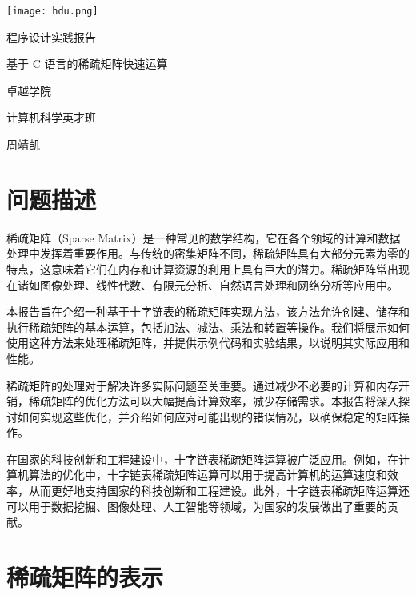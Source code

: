 \documentclass[12pt]{article}
\begin{document}
\begin{titlepage}


\parbox[c]{0pt}{
    \texttt{[image: hdu.png]}
}

\setlength{\parindent}{0pt}
\centering
\vfill
{ \heiti \textcolor{xblue}{程序设计实践报告}\par}
\vspace{10pt}
{ \heiti 基于 C 语言的稀疏矩阵快速运算\par}
\vfill
{\large \heiti 卓越学院\par
计算机科学英才班\par
周靖凯\par
}
\vfill
\restoregeometry

\end{titlepage}

\renewcommand\contentsname{\textcolor{xblue}{目录}}
    \tableofcontents
\clearpage

\setcounter{page}{1}

\section{问题描述}

稀疏矩阵（Sparse Matrix）是一种常见的数学结构，它在各个领域的计算和数据处理中发挥着重要作用。与传统的密集矩阵不同，稀疏矩阵具有大部分元素为零的特点，这意味着它们在内存和计算资源的利用上具有巨大的潜力。稀疏矩阵常出现在诸如图像处理、线性代数、有限元分析、自然语言处理和网络分析等应用中。

本报告旨在介绍一种基于十字链表的稀疏矩阵实现方法，该方法允许创建、储存和执行稀疏矩阵的基本运算，包括加法、减法、乘法和转置等操作。我们将展示如何使用这种方法来处理稀疏矩阵，并提供示例代码和实验结果，以说明其实际应用和性能。

稀疏矩阵的处理对于解决许多实际问题至关重要。通过减少不必要的计算和内存开销，稀疏矩阵的优化方法可以大幅提高计算效率，减少存储需求。本报告将深入探讨如何实现这些优化，并介绍如何应对可能出现的错误情况，以确保稳定的矩阵操作。

在国家的科技创新和工程建设中，十字链表稀疏矩阵运算被广泛应用。例如，在计算机算法的优化中，十字链表稀疏矩阵运算可以用于提高计算机的运算速度和效率，从而更好地支持国家的科技创新和工程建设。此外，十字链表稀疏矩阵运算还可以用于数据挖掘、图像处理、人工智能等领域，为国家的发展做出了重要的贡献。

\newpage

\section{稀疏矩阵的表示}
\end{document}

